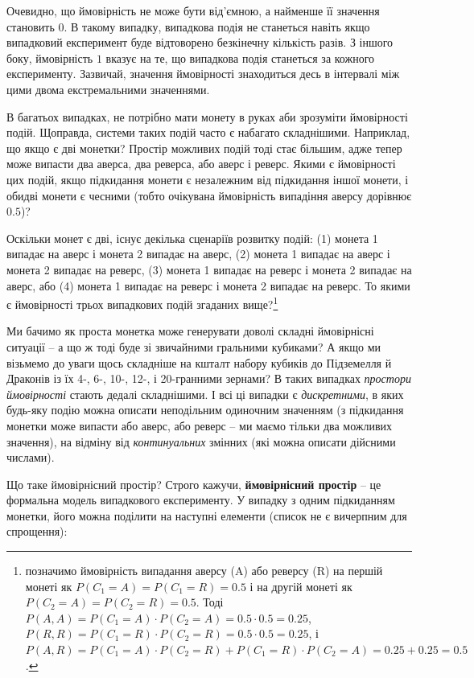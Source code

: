 \documentclass[
  11pt,
]{book}
\begin{document}
Очевидно, що ймовірність не може бути від'ємною, а найменше її значення становить \(0\). В такому випадку, випадкова подія не станеться навіть якщо випадковий експеримент буде відтоворено безкінечну кількість разів. З іншого боку, ймовірність \(1\) вказує на те, що випадкова подія станеться за кожного експерименту. Зазвичай, значення ймовірності знаходиться десь в інтервалі між цими двома екстремальними значеннями.

В багатьох випадках, не потрібно мати монету в руках аби зрозуміти ймовірності подій. Щоправда, системи таких подій часто є набагато складнішими. Наприклад, що якщо є дві монетки? Простір можливих подій тоді стає більшим, адже тепер може випасти два аверса, два реверса, або аверс і реверс. Якими є ймовірності цих подій, якщо підкидання монети є незалежним від підкидання іншої монети, і обидві монети є чесними (тобто очікувана ймовірність випадіння аверсу дорівнює \(0.5\))?

Оскільки монет є дві, існує декілька сценаріїв розвитку подій: (1) монета 1 випадає на аверс і монета 2 випадає на аверс, (2) монета 1 випадає на аверс і монета 2 випадає на реверс, (3) монета 1 випадає на реверс і монета 2 випадає на аверс, або (4) монета 1 випадає на реверс і монета 2 випадає на реверс. То якими є ймовірності трьох випадкових подій згаданих вище?\footnote{позначимо ймовірність випадання аверсу (A) або реверсу (R) на першій монеті як \(P(C_1 = A) = P(C_1 = R) = 0.5\) і на другій монеті як \(P(C_2 = A) = P(C_2 = R) = 0.5\). Тоді \(P(A, A) = P(C_1 = A) \cdot P(C_2 =  A) = 0.5 \cdot 0.5 = 0.25\), \(P(R, R) = P(C_1 = R) \cdot P(C_2 =  R) = 0.5 \cdot 0.5 = 0.25\), і \(P(A, R) = P(C_1 = A) \cdot P(C_2 = R) + P(C_1 = R) \cdot P(C_2 = A) = 0.25 + 0.25 = 0.5\).}

Ми бачимо як проста монетка може генерувати доволі складні ймовірнісні ситуації -- а що ж тоді буде зі звичайними гральними кубиками? А якщо ми візьмемо до уваги щось складніше на кшталт набору кубиків до Підземелля й Драконів із їх 4-, 6-, 10-, 12-, і 20-гранними зернами? В таких випадках \emph{простори ймовірності} стають дедалі складнішими. І всі ці випадки є \emph{дискретними}, в яких будь-яку подію можна описати неподільним одиночним значенням (з підкидання монетки може випасти або аверс, або реверс -- ми маємо тільки два можливих значення), на відміну від \emph{континуальних} змінних (які можна описати дійсними числами).

Що таке ймовірнісний простір? Строго кажучи, \textbf{ймовірнісний простір} -- це формальна модель випадкового експерименту. У випадку з одним підкиданням монетки, його можна поділити на наступні елементи (список не є вичерпним для спрощення):
\end{document}
